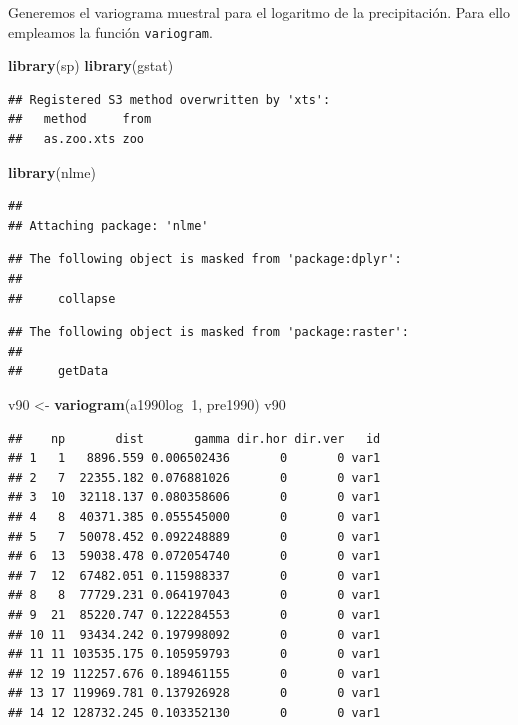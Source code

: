 \documentclass[11pt,]{article}
\newenvironment{Shaded}{\begin{snugshade}}{\end{snugshade}}
\newcommand{\KeywordTok}[1]{\textcolor[rgb]{0.13,0.29,0.53}{\textbf{#1}}}
\newcommand{\DecValTok}[1]{\textcolor[rgb]{0.00,0.00,0.81}{#1}}
\newcommand{\StringTok}[1]{\textcolor[rgb]{0.31,0.60,0.02}{#1}}
\newcommand{\OperatorTok}[1]{\textcolor[rgb]{0.81,0.36,0.00}{\textbf{#1}}}
\newcommand{\NormalTok}[1]{#1}
\begin{document}
Generemos el variograma muestral para el logaritmo de la precipitación.
Para ello empleamos la función \texttt{variogram}.

\begin{Shaded}
\begin{Highlighting}[]
\KeywordTok{library}\NormalTok{(sp)}
\KeywordTok{library}\NormalTok{(gstat)}
\end{Highlighting}
\end{Shaded}

\begin{verbatim}
## Registered S3 method overwritten by 'xts':
##   method     from
##   as.zoo.xts zoo
\end{verbatim}

\begin{Shaded}
\begin{Highlighting}[]
\KeywordTok{library}\NormalTok{(nlme)}
\end{Highlighting}
\end{Shaded}

\begin{verbatim}
## 
## Attaching package: 'nlme'
\end{verbatim}

\begin{verbatim}
## The following object is masked from 'package:dplyr':
## 
##     collapse
\end{verbatim}

\begin{verbatim}
## The following object is masked from 'package:raster':
## 
##     getData
\end{verbatim}

\begin{Shaded}
\begin{Highlighting}[]
\NormalTok{v90 <-}\StringTok{ }\KeywordTok{variogram}\NormalTok{(a1990log}\OperatorTok{~}\DecValTok{1}\NormalTok{, pre1990)}
\NormalTok{v90}
\end{Highlighting}
\end{Shaded}

\begin{verbatim}
##    np       dist       gamma dir.hor dir.ver   id
## 1   1   8896.559 0.006502436       0       0 var1
## 2   7  22355.182 0.076881026       0       0 var1
## 3  10  32118.137 0.080358606       0       0 var1
## 4   8  40371.385 0.055545000       0       0 var1
## 5   7  50078.452 0.092248889       0       0 var1
## 6  13  59038.478 0.072054740       0       0 var1
## 7  12  67482.051 0.115988337       0       0 var1
## 8   8  77729.231 0.064197043       0       0 var1
## 9  21  85220.747 0.122284553       0       0 var1
## 10 11  93434.242 0.197998092       0       0 var1
## 11 11 103535.175 0.105959793       0       0 var1
## 12 19 112257.676 0.189461155       0       0 var1
## 13 17 119969.781 0.137926928       0       0 var1
## 14 12 128732.245 0.103352130       0       0 var1
\end{verbatim}
\end{document}
